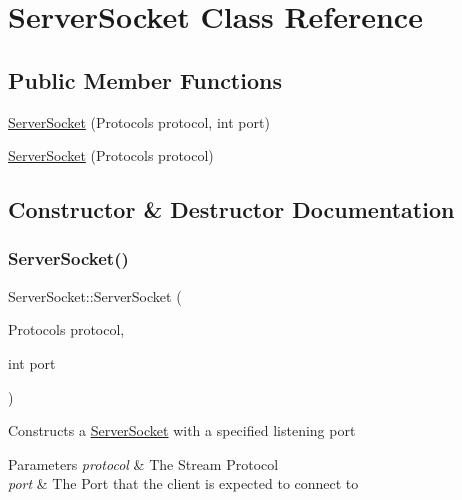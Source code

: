 \hypertarget{classServerSocket}{}\section{Server\+Socket Class Reference}
\label{classServerSocket}
\subsection*{Public Member Functions}
\begin{DoxyCompactItemize}
\item 
\hyperlink{classServerSocket_a8d427653b6587e0b961a1c14931332d4}{Server\+Socket} (Protocols protocol, int port)
\item 
\hyperlink{classServerSocket_aa650224a3d6d55450f8e6d13318d41b3}{Server\+Socket} (Protocols protocol)
\end{DoxyCompactItemize}


\subsection{Constructor \& Destructor Documentation}
\mbox{\label{classServerSocket_a8d427653b6587e0b961a1c14931332d4}} 
\subsubsection{\texorpdfstring{Server\+Socket()}{ServerSocket()}\hspace{0.1cm}{\footnotesize\ttfamily [1/2]}}
{\footnotesize\ttfamily Server\+Socket\+::\+Server\+Socket (\begin{DoxyParamCaption}\item[{Protocols}]{protocol,  }\item[{int}]{port }\end{DoxyParamCaption})}

Constructs a \hyperlink{classServerSocket}{Server\+Socket} with a specified listening port 
\begin{DoxyParams}{Parameters}
{\em protocol} & The Stream Protocol \\
\hline
{\em port} & The Port that the client is expected to connect to \\
\hline
\end{DoxyParams}
\mbox{\label{classServerSocket_aa650224a3d6d55450f8e6d13318d41b3}} 
